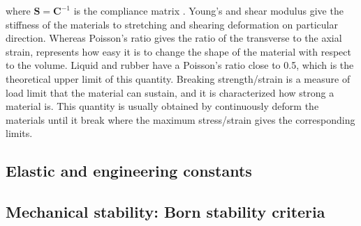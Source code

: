where $\boldsymbol{S}=\boldsymbol{C}^{-1}$ is the compliance matrix \citep[e.g.][]{nye1985physical}. Young's and shear modulus give the stiffness of the materials to stretching and shearing deformation on particular direction. Whereas Poisson's ratio gives the ratio of the transverse to the axial strain, represents how easy it is to change the shape of the material with respect to the volume. Liquid and rubber have a Poisson's ratio close to 0.5, which is the theoretical upper limit of this quantity. Breaking strength/strain is a measure of load limit that the material can sustain, and it is characterized how strong a material is. This quantity is usually obtained by continuously deform the materials until it break where the maximum stress/strain gives the corresponding limits. 



\subsection{Elastic and engineering constants}
\subsection{Mechanical stability: Born stability criteria}